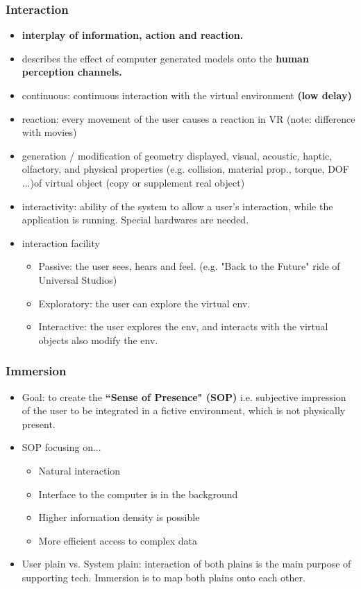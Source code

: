 \documentclass{standalone}
\begin{document}
\subsubsection*{Interaction}

\begin{itemize}
	\item \textbf{interplay of information, action and reaction.}
	\item describes the effect of computer generated models onto the \textbf{human perception channels.} 
	\item continuous: continuous interaction with the virtual environment \textbf{(low delay)}
	\item reaction: every movement of the user causes a reaction in VR (note: difference with movies)
	\item generation / modification of geometry displayed, visual, acoustic, haptic, olfactory, and physical properties (e.g. collision, material prop., torque, DOF ...)of virtual object (copy or supplement real object)
	\item interactivity: ability of the system to allow a user's interaction, while the application is running. Special hardwares are needed.
	\item interaction facility 
		\begin{itemize}
			\item Passive: the user sees, hears and feel. (e.g. "Back to the Future" ride of Universal Studios)
			\item Exploratory: the user can explore the virtual env. 
			\item Interactive: the user explores the env, and interacts with the virtual objects also modify the env.
		\end{itemize}
\end{itemize}

\subsubsection*{Immersion}

\begin{itemize}
	\item Goal: to create the \textbf{``Sense of Presence" (SOP)} i.e. subjective impression of the user to be integrated in a fictive environment, which is not physically present.
	\item SOP focusing on...
		\begin{itemize}
			\item Natural interaction
			\item Interface to the computer is in the background
			\item Higher information density is possible
			\item More efficient access to complex data
		\end{itemize}
	\item User plain vs. System plain: interaction of both plains is the main purpose of supporting tech. Immersion is to map both plains onto each other.
\end{itemize}
\end{document}
